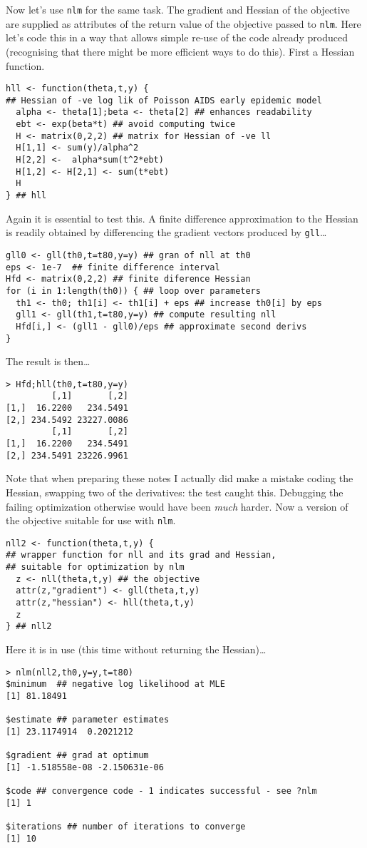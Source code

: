 \documentclass[10pt] {article}
\theoremstyle{definition}
\begin{document}
Now let's use {\tt nlm} for the same task. The gradient and Hessian of the objective are supplied as attributes of the return value of the objective passed to {\tt nlm}. Here let's code this in a way that allows simple re-use of the code already produced (recognising that there might be more efficient ways to do this). First a Hessian function.
\begin{lstlisting}
hll <- function(theta,t,y) {
## Hessian of -ve log lik of Poisson AIDS early epidemic model
  alpha <- theta[1];beta <- theta[2] ## enhances readability
  ebt <- exp(beta*t) ## avoid computing twice
  H <- matrix(0,2,2) ## matrix for Hessian of -ve ll
  H[1,1] <- sum(y)/alpha^2
  H[2,2] <-  alpha*sum(t^2*ebt)
  H[1,2] <- H[2,1] <- sum(t*ebt)
  H
} ## hll
\end{lstlisting}
Again it is essential to test this. A finite difference approximation to the Hessian is readily obtained by differencing the gradient vectors produced by {\tt gll}\ldots
\begin{lstlisting}
gll0 <- gll(th0,t=t80,y=y) ## gran of nll at th0
eps <- 1e-7  ## finite difference interval 
Hfd <- matrix(0,2,2) ## finite diference Hessian
for (i in 1:length(th0)) { ## loop over parameters
  th1 <- th0; th1[i] <- th1[i] + eps ## increase th0[i] by eps
  gll1 <- gll(th1,t=t80,y=y) ## compute resulting nll
  Hfd[i,] <- (gll1 - gll0)/eps ## approximate second derivs
}
\end{lstlisting}
The result is then\ldots
\begin{lstlisting}
> Hfd;hll(th0,t=t80,y=y)
         [,1]       [,2]
[1,]  16.2200   234.5491
[2,] 234.5492 23227.0086
         [,1]       [,2]
[1,]  16.2200   234.5491
[2,] 234.5491 23226.9961
\end{lstlisting}
Note that when preparing these notes I actually did make a mistake coding the Hessian, swapping two of the derivatives: the test caught this. Debugging the failing optimization otherwise would have been {\em much} harder. Now a version of the objective suitable for use with {\tt nlm}.
\begin{lstlisting}
nll2 <- function(theta,t,y) {
## wrapper function for nll and its grad and Hessian,
## suitable for optimization by nlm 
  z <- nll(theta,t,y) ## the objective
  attr(z,"gradient") <- gll(theta,t,y)
  attr(z,"hessian") <- hll(theta,t,y)
  z
} ## nll2
\end{lstlisting}
Here it is in use (this time without returning the Hessian)\ldots
\begin{lstlisting}
> nlm(nll2,th0,y=y,t=t80)
$minimum  ## negative log likelihood at MLE
[1] 81.18491

$estimate ## parameter estimates
[1] 23.1174914  0.2021212

$gradient ## grad at optimum
[1] -1.518558e-08 -2.150631e-06

$code ## convergence code - 1 indicates successful - see ?nlm
[1] 1

$iterations ## number of iterations to converge
[1] 10
\end{lstlisting}
\end{document}
